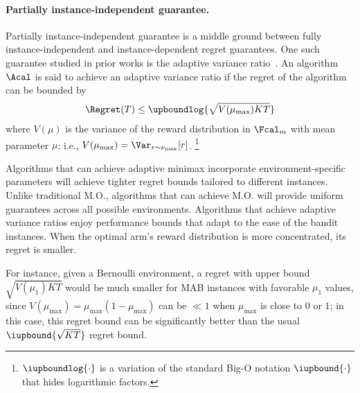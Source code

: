 \paragraph{Partially instance-independent guarantee.} Partially instance-independent guarantee is a middle ground between fully instance-independent and instance-dependent regret guarantees.
    One such guarantee studied in prior works is the adaptive variance ratio~\citep{qin2023kullback}.
    An algorithm $\Acal$ is said to achieve an adaptive variance ratio if the regret of the algorithm can be bounded by
    \begin{align*}
        \Regret(T) \leq \upboundlog{\sqrt{V(\mu_{\max}) KT}}
    \end{align*}
    where $V(\mu)$ is the variance of the reward distribution in $\Fcal_m$ with mean parameter $\mu$; i.e., 
    $V(\mu_{\max}) = \Var_{r \sim \nu_{\max}}[r]$.
    \footnote{$\iupboundlog{\cdot}$ is a variation of the standard Big-O notation $\iupbound{\cdot}$ that hides logarithmic factors.}
    
    
    
    Algorithms that can achieve adaptive minimax incorporate environment-specific parameters will achieve tighter regret bounds tailored to different instances. 
    Unlike traditional M.O., algorithms that can achieve M.O. will provide uniform guarantees across all possible environments. 
    Algorithms that achieve adaptive variance ratios enjoy performance bounds that adapt to the ease of the bandit instances. When the optimal arm's reward distribution is more concentrated, its regret is smaller.
    
    For instance, given a Bernoulli environment, a regret with upper bound $\sqrt{V(\mu_1) KT}$ would be much smaller for MAB instances with favorable $\mu_1$ values, since $V(\mu_{\max}) = \mu_{\max}(1-\mu_{\max})$ can be $\ll1$ when $\mu_{\max}$ is close to $0$ or $1$; in this case, this regret bound can be significantly better than the usual $\iupbound{\sqrt{KT}}$ regret bound.


